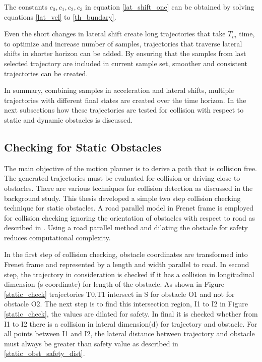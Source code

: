 

The constants $ { c_0,c_1,c_2,c_3}  $ in equation \ref{lat_shift_one} can be obtained by solving equations \ref{lat_vel} to \ref{th_bundary}.

Even the short changes in lateral shift create long trajectories that take $T_m$ time, to optimize and increase number of samples, trajectories that traverse lateral shifts in shorter horizon can be added. By ensuring that the samples from last selected trajectory are included in current sample set, smoother and consistent trajectories can be created.  

In summary, combining samples in acceleration and lateral shifts, multiple trajectories with different final states are created over the time horizon. In the next subsections how these trajectories are tested for collision with respect to static and dynamic obstacles is discussed. 



\subsection{Checking for Static Obstacles} \label{osbtacle_check_satic}
The main objective of the motion planner is to derive a path that is collision free. The generated trajectories must be evaluated for collision or driving close to obstacles. There are various techniques for collision detection as discussed in the background study. This thesis developed a simple two step collision checking technique for static obstacles. A road parallel model in Frenet frame is employed for collision checking ignoring the orientation of obstacles with respect to road as described in \cite{cmu_parallel_thesis}. Using a road parallel method and dilating the obstacle for safety reduces computational complexity. 


In the first step of collision checking, obstacle coordinates are transformed into Frenet frame and represented by a length and width parallel to road. In second step, the trajectory in consideration is checked if it has a collision in longitudinal dimension (s coordinate) for length of the obstacle. As shown in Figure \ref{static_check} trajectories T0,T1 intersect in S for obstacle O1 and not for obstacle O2. The next step is to find this intersection region, I1 to I2 in Figure \ref{static_check}, the values are dilated for safety. In final it is checked whether from I1 to I2 there is a collision in lateral dimension(d) for trajectory and obstacle. For all points between I1 and I2, the lateral distance between trajectory and obstacle must always be greater than safety value as described in \ref{static_obst_safety_dist}. 

